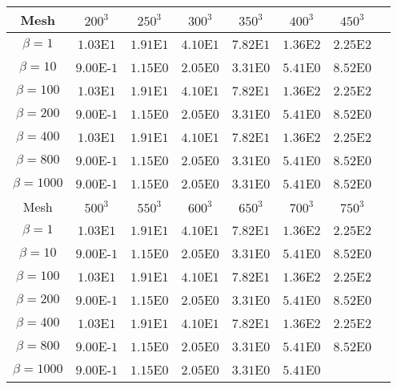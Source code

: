 \begin{table}[ht!]
    \centering
    \begin{tabular}{|c|c|c|c|c|c|c|c|}
    \hline
          Mesh & $200^3$ & $250^3$ & $300^3$ & $350^3$ & $400^3$ & $450^3$\\
    \hline
          $\beta = 1$ & $1.03$E$1$ & $1.91$E$1$ & $4.10$E$1$ & $7.82$E$1$ & $1.36$E$2$ & $2.25$E$2$\\
    \hline
          $\beta = 10$ & $9.00$E-$1$ & $1.15$E$0$ & $2.05$E$0$ & $3.31$E$0$ & $5.41$E$0$ &
         $8.52$E$0$\\
    \hline
         $\beta = 100$ & $1.03$E$1$ & $1.91$E$1$ & $4.10$E$1$ & $7.82$E$1$ & $1.36$E$2$ & $2.25$E$2$\\
    \hline
          $\beta = 200$ & $9.00$E-$1$ & $1.15$E$0$ & $2.05$E$0$ & $3.31$E$0$ & $5.41$E$0$ &
         $8.52$E$0$\\
    \hline
         $\beta = 400$ & $1.03$E$1$ & $1.91$E$1$ & $4.10$E$1$ & $7.82$E$1$ & $1.36$E$2$ & $2.25$E$2$\\
    \hline
          $\beta = 800$ & $9.00$E-$1$ & $1.15$E$0$ & $2.05$E$0$ & $3.31$E$0$ & $5.41$E$0$ &
         $8.52$E$0$\\
    \hline
          $\beta = 1000$ & $9.00$E-$1$ & $1.15$E$0$ & $2.05$E$0$ & $3.31$E$0$ & $5.41$E$0$ &
         $8.52$E$0$\\
    \hline
    \hline
         Mesh & $500^3$ & $550^3$ & $600^3$ & $650^3$ & $700^3$ & $750^3$\\
    \hline
            $\beta = 1$ & $1.03$E$1$ & $1.91$E$1$ & $4.10$E$1$ & $7.82$E$1$ & $1.36$E$2$ & $2.25$E$2$\\
    \hline
          $\beta = 10$ & $9.00$E-$1$ & $1.15$E$0$ & $2.05$E$0$ & $3.31$E$0$ & $5.41$E$0$ &
         $8.52$E$0$\\
    \hline
         $\beta = 100$ & $1.03$E$1$ & $1.91$E$1$ & $4.10$E$1$ & $7.82$E$1$ & $1.36$E$2$ & $2.25$E$2$\\
    \hline
          $\beta = 200$ & $9.00$E-$1$ & $1.15$E$0$ & $2.05$E$0$ & $3.31$E$0$ & $5.41$E$0$ &
         $8.52$E$0$\\
    \hline
         $\beta = 400$ & $1.03$E$1$ & $1.91$E$1$ & $4.10$E$1$ & $7.82$E$1$ & $1.36$E$2$ & $2.25$E$2$\\
    \hline
          $\beta = 800$ & $9.00$E-$1$ & $1.15$E$0$ & $2.05$E$0$ & $3.31$E$0$ & $5.41$E$0$ &
         $8.52$E$0$\\
    \hline
          $\beta = 1000$ & $9.00$E-$1$ & $1.15$E$0$ & $2.05$E$0$ & $3.31$E$0$ & $5.41$E$0$ &

\end{tabular}
\end{table}
